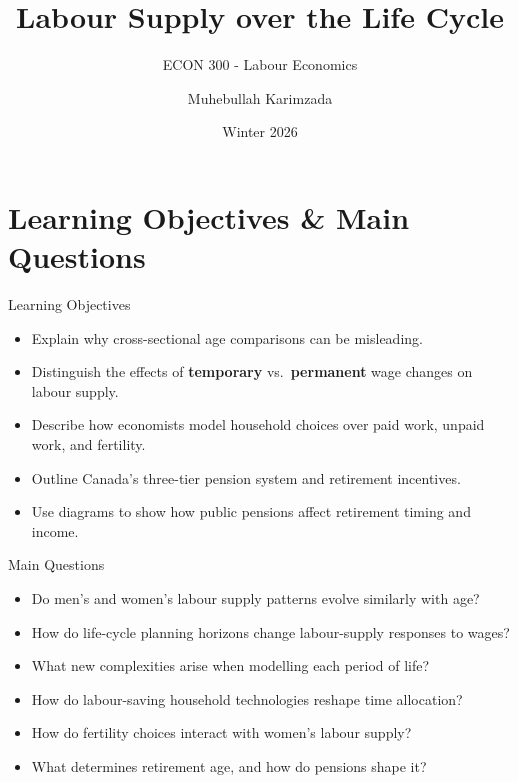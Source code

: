 \documentclass[aspectratio=169]{beamer}
\title{\textbf{Labour Supply over the Life Cycle \vspace{.5cm}\\  }}
\subtitle{ {\large ECON 300 - Labour Economics}}
\author{Muhebullah Karimzada}
\date{Winter 2026}
\begin{document}
\begin{frame}[plain]
  \titlepage
\end{frame}

\section{Learning Objectives \& Main Questions}

\begin{frame}{Learning Objectives}
\transfade
\begin{itemize}[<+->]
  \item Explain why cross-sectional age comparisons can be misleading.
  \item Distinguish the effects of \textbf{temporary} vs.\ \textbf{permanent} wage changes on labour supply.
  \item Describe how economists model household choices over paid work, unpaid work, and fertility.
  \item Outline Canada’s three-tier pension system and retirement incentives.
  \item Use diagrams to show how public pensions affect retirement timing and income.
\end{itemize}
\end{frame}

\begin{frame}{Main Questions}
\transfade
\begin{itemize}[<+->]
  \item Do men’s and women’s labour supply patterns evolve similarly with age?
  \item How do life-cycle planning horizons change labour-supply responses to wages?
  \item What new complexities arise when modelling each period of life?
  \item How do labour-saving household technologies reshape time allocation?
  \item How do fertility choices interact with women’s labour supply?
  \item What determines retirement age, and how do pensions shape it?
\end{itemize}
\end{frame}

\end{document}
